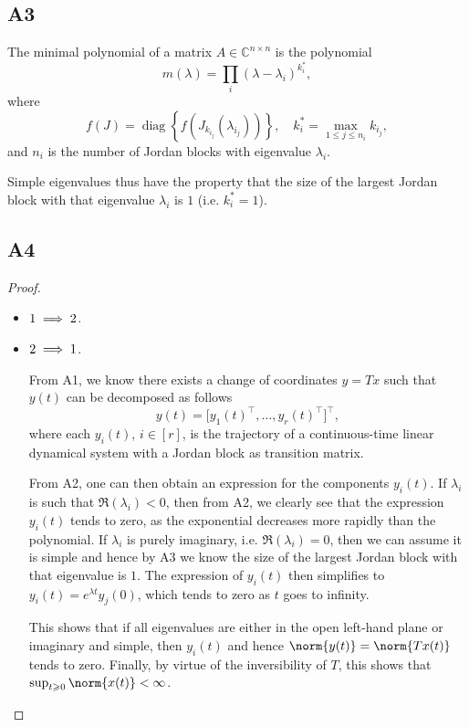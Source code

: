 \documentclass[11pt]{article}
\DeclareMathOperator{\diag}{diag}
\newcommand{\complex}{\mathbb{C}} %
\begin{document}
\subsection*{A3}
The minimal polynomial of a matrix \(A \in \complex^{n \times n}\) is the polynomial
\[
m(\lambda) = \prod_i (\lambda - \lambda_i)^{k_i^*},
\]
where
\[
f(J) = \diag \left\{f\left(J_{k_{i_j}}(\lambda_{i_j})\right)\right\}, \quad k_i^* = \max_{1 \leqslant j \leqslant n_i} k_{i_j},
\]
and \(n_i\) is the number of Jordan blocks with eigenvalue \(\lambda_i\).

Simple eigenvalues thus have the property that the size of the largest Jordan block with that eigenvalue \(\lambda_i\) is \(1\) (i.e. \(k_i^* = 1\)).

\subsection*{A4}
\begin{proof}\leavevmode
\begin{itemize}
	\item \(\textnormal{1} \implies \textnormal{2}\).
	\item \(\textnormal{2} \implies \textnormal{1}\).

	From A1, we know there exists a change of coordinates $y=Tx$ such that $y(t)$ can be decomposed as follows
	\[
	y(t) = \big[y_1(t)^\top, \dots, y_r(t)^\top\big]^\top,
	\]
	where each $y_i(t)$, $i \in [r]$, is the trajectory of a continuous-time linear dynamical system with a Jordan block as transition matrix.
	
	From A2, one can then obtain an expression for the components $y_i(t)$.
	If $\lambda_i$ is such that $\Re(\lambda_i)<0$, then from A2, we clearly see that the expression $y_i(t)$ tends to zero, as the exponential decreases more rapidly than the polynomial.
	If $\lambda_i$ is purely imaginary, i.e. $\Re(\lambda_i) = 0$, then we can assume it is simple and hence by A3 we know the size of the largest Jordan block with that eigenvalue is \(1\).
	The expression of $y_i(t)$ then simplifies to $y_i(t)=e^{\lambda t} y_j(0)$, which tends to zero as \(t\) goes to infinity.
	
	This shows that if all eigenvalues are either in the open left-hand plane or imaginary and simple, then $y_i(t)$ and hence $\norm{y(t)}=\norm{Tx(t)}$ tends to zero.
	Finally, by virtue of the inversibility of \(T\), this shows that \(\sup_{t \geqslant 0} \norm{x(t)} < \infty\).\qedhere
\end{itemize}
\end{proof}
\end{document}
